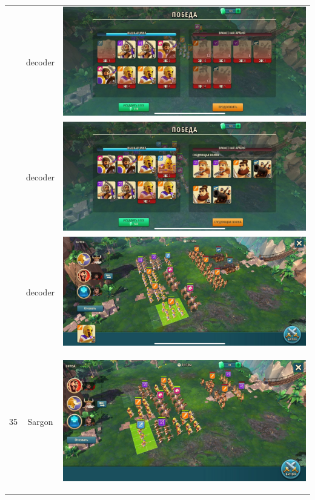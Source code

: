 \begin{longtable}{|c|c|c|}
	& decoder &
	\includegraphics[width=0.75\linewidth]{./parts/media/TreasureHunt/34/decoder/photo_2022-04-07_10-02-50.jpg} \\
	& decoder &
	\includegraphics[width=0.75\linewidth]{./parts/media/TreasureHunt/34/decoder/photo_2022-04-07_10-02-43.jpg} \\
	& decoder &
	\includegraphics[width=0.75\linewidth]{./parts/media/TreasureHunt/34/decoder/photo_2022-04-07_10-02-34.jpg} \\
	\hline
	\multirow{8}{*}{35} & Sargon &
	\hypertarget{fight35}{\includegraphics[width=0.75\linewidth]{./parts/media/TreasureHunt/35/sargon/photo_2022-04-07_10-08-45.jpg}} \\

\end{longtable}

